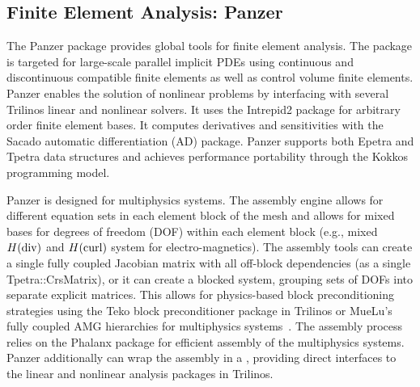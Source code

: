 \subsection{Finite Element Analysis: Panzer}
The Panzer package provides global tools for finite element analysis. The package is targeted for large-scale parallel implicit PDEs using continuous and discontinuous compatible finite elements as well as control volume finite elements. Panzer enables the solution of nonlinear problems by interfacing with several Trilinos linear and nonlinear solvers. It uses the Intrepid2 package for arbitrary order finite element bases. It computes derivatives and sensitivities with the Sacado automatic differentiation (AD) package. Panzer supports both Epetra and Tpetra data structures and achieves performance portability through the Kokkos programming model.

Panzer is designed for multiphysics systems. The assembly engine allows for different equation sets in each element block of the mesh and allows for mixed bases for degrees of freedom (DOF) within each element block (e.g., mixed $H(\rm{div})$ and $H(\rm{curl})$ system for electro-magnetics). The assembly tools can create a single fully coupled Jacobian matrix with all off-block dependencies (as a single Tpetra::CrsMatrix), or it can create a blocked system, grouping sets of DOFs into separate explicit matrices. This allows for physics-based block preconditioning strategies using the Teko block preconditioner package in Trilinos \cite{Bonilla2023,Cyr2016a} or MueLu's fully coupled AMG hierarchies for multiphysics systems~\cite{Ohm2022a}. The assembly process relies on the Phalanx package for efficient assembly of the multiphysics systems. Panzer additionally can wrap the assembly in a , providing direct interfaces to the linear and nonlinear analysis packages in Trilinos.

